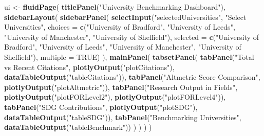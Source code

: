 \documentclass[
]{article}
\newenvironment{Shaded}{\begin{snugshade}}{\end{snugshade}}
\newcommand{\AttributeTok}[1]{\textcolor[rgb]{0.13,0.29,0.53}{#1}}
\newcommand{\ConstantTok}[1]{\textcolor[rgb]{0.56,0.35,0.01}{#1}}
\newcommand{\FunctionTok}[1]{\textcolor[rgb]{0.13,0.29,0.53}{\textbf{#1}}}
\newcommand{\NormalTok}[1]{#1}
\newcommand{\OtherTok}[1]{\textcolor[rgb]{0.56,0.35,0.01}{#1}}
\newcommand{\StringTok}[1]{\textcolor[rgb]{0.31,0.60,0.02}{#1}}
\begin{document}
\begin{Shaded}
\begin{Highlighting}[]
\NormalTok{ui }\OtherTok{\textless{}{-}} \FunctionTok{fluidPage}\NormalTok{(}
  \FunctionTok{titlePanel}\NormalTok{(}\StringTok{"University Benchmarking Dashboard"}\NormalTok{),}
  \FunctionTok{sidebarLayout}\NormalTok{(}
    \FunctionTok{sidebarPanel}\NormalTok{(}
      \FunctionTok{selectInput}\NormalTok{(}\StringTok{"selectedUniversities"}\NormalTok{, }\StringTok{"Select Universities"}\NormalTok{, }
                  \AttributeTok{choices =} \FunctionTok{c}\NormalTok{(}\StringTok{"University of Bradford"}\NormalTok{, }\StringTok{"University of Leeds"}\NormalTok{, }\StringTok{"University of Manchester"}\NormalTok{, }\StringTok{"University of Sheffield"}\NormalTok{),}
                  \AttributeTok{selected =} \FunctionTok{c}\NormalTok{(}\StringTok{"University of Bradford"}\NormalTok{, }\StringTok{"University of Leeds"}\NormalTok{, }\StringTok{"University of Manchester"}\NormalTok{, }\StringTok{"University of Sheffield"}\NormalTok{),}
                  \AttributeTok{multiple =} \ConstantTok{TRUE}\NormalTok{)}
\NormalTok{    ),}
    \FunctionTok{mainPanel}\NormalTok{(}
      \FunctionTok{tabsetPanel}\NormalTok{(}
        \FunctionTok{tabPanel}\NormalTok{(}\StringTok{"Total vs Recent Citations"}\NormalTok{, }
                 \FunctionTok{plotlyOutput}\NormalTok{(}\StringTok{"plotCitations"}\NormalTok{), }
                 \FunctionTok{dataTableOutput}\NormalTok{(}\StringTok{"tableCitations"}\NormalTok{)),}
        \FunctionTok{tabPanel}\NormalTok{(}\StringTok{"Altmetric Score Comparison"}\NormalTok{, }
                 \FunctionTok{plotlyOutput}\NormalTok{(}\StringTok{"plotAltmetric"}\NormalTok{)),}
        \FunctionTok{tabPanel}\NormalTok{(}\StringTok{"Research Output in Fields"}\NormalTok{, }
                 \FunctionTok{plotlyOutput}\NormalTok{(}\StringTok{"plotFORLevel2"}\NormalTok{),}
                 \FunctionTok{plotlyOutput}\NormalTok{(}\StringTok{"plotFORLevel4"}\NormalTok{)),}
        \FunctionTok{tabPanel}\NormalTok{(}\StringTok{"SDG Contributions"}\NormalTok{, }
                 \FunctionTok{plotlyOutput}\NormalTok{(}\StringTok{"plotSDG"}\NormalTok{),}
                 \FunctionTok{dataTableOutput}\NormalTok{(}\StringTok{"tableSDG"}\NormalTok{)),}
        \FunctionTok{tabPanel}\NormalTok{(}\StringTok{"Benchmarking Universities"}\NormalTok{, }
                 \FunctionTok{dataTableOutput}\NormalTok{(}\StringTok{"tableBenchmark"}\NormalTok{))}
\NormalTok{      )}
\NormalTok{    )}
\NormalTok{  )}
\NormalTok{)}


\end{Highlighting}
\end{Shaded}
\end{document}
